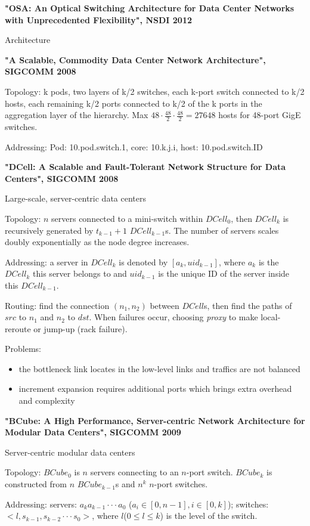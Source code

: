 \documentclass[journal,onecolumn,11pt]{IEEEtran}
\begin{document}
\textbf{"OSA: An Optical Switching Architecture for Data Center Networks with Unprecedented Flexibility", NSDI 2012}

Architecture

\textbf{"A Scalable, Commodity Data Center Network Architecture", SIGCOMM 2008}

Topology: k pods, two layers of k/2 switches, each k-port switch connected to k/2 hosts, each remaining k/2 ports connected to k/2 of the k ports in the aggregation layer of the hierarchy. Max $48\cdot \frac{48}{2} \cdot \frac{48}{2}=27648$ hosts for 48-port GigE switches.

Addressing: Pod: 10.pod.switch.1, core: 10.k.j.i, host: 10.pod.switch.ID

\textbf{"DCell: A Scalable and Fault-Tolerant Network Structure for Data Centers", SIGCOMM 2008}

Large-scale, server-centric data centers

Topology:
$n$ servers connected to a mini-switch within $DCell_0$, then $DCell_k$ is recursively generated by $t_{k-1}+1$ $DCell_{k-1}$s. The number of servers scales doubly exponentially as the node degree increases.

Addressing:
a server in $DCell_k$ is denoted by $[a_k,uid_{k-1}]$, where $a_k$ is the $DCell_k$ this server belongs to and $uid_{k-1}$ is the unique ID of the server inside this $DCell_{k-1}$.

Routing: find the connection $(n_1,n_2)$ between $DCell$s, then find the paths of $src$ to $n_1$ and $n_2$ to $dst$. When failures occur, choosing \textit{proxy} to make local-reroute or jump-up (rack failure).

Problems:
\begin{itemize}
  \item the bottleneck link locates in the low-level links and traffics are not balanced
  \item increment expansion requires additional ports which brings extra overhead and complexity
\end{itemize}


\textbf{"BCube: A High Performance, Server-centric Network Architecture for Modular Data Centers", SIGCOMM 2009}

Server-centric modular data centers

Topology:
$BCube_0$ is $n$ servers connecting to an $n$-port switch. $BCube_k$ is constructed from $n$ $BCube_{k-1}$s and $n^k$ $n$-port switches.

Addressing:
servers: $a_ka_{k-1}\cdot\cdot\cdot a_0$ ($a_i\in [0,n-1],i\in [0,k]$); switches: $<l,s_{k-1},s_{k-2}\cdot\cdot\cdot s_0>$, where $l$($0\leq l\leq k$) is the level of the switch.
\end{document}

